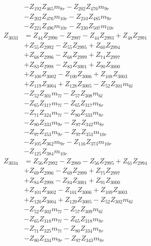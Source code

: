 \begin{multicols}{2}
\begin{align}
&- Z_{192}Z_{465}m_{8r} - Z_{202}Z_{476}m_{9r}  \nonumber \\
&- Z_{202}Z_{476}m_{10r} - Z_{210}Z_{485}m_{9r}  \nonumber \\
&- Z_{221}Z_{496}m_{10r} - Z_{230}Z_{507}m_{10r} \nonumber \\
Z_{3033} &= Z_{44}Z_{2990} - Z_{2987} - Z_{44}Z_{2993} + Z_{48}Z_{2991}  \nonumber \\
&+ Z_{55}Z_{2992} - Z_{55}Z_{2995} + Z_{60}Z_{2994}  \nonumber \\
&+ Z_{68}Z_{2996} - Z_{68}Z_{2999} + Z_{74}Z_{2997}  \nonumber \\
&+ Z_{83}Z_{2998} - Z_{83}Z_{3001} + Z_{90}Z_{3000}  \nonumber \\
&+ Z_{100}Z_{3002} - Z_{100}Z_{3006} + Z_{108}Z_{3003}  \nonumber \\
&+ Z_{119}Z_{3004} + Z_{128}Z_{3005} - Z_{52}Z_{301}m_{6l}  \nonumber \\
&- Z_{52}Z_{301}m_{7l} - Z_{57}Z_{308}m_{6l}  \nonumber \\
&- Z_{65}Z_{317}m_{7l} - Z_{65}Z_{317}m_{8r}  \nonumber \\
&- Z_{71}Z_{324}m_{7l} - Z_{80}Z_{333}m_{8r}  \nonumber \\
&- Z_{80}Z_{333}m_{9r} - Z_{87}Z_{342}m_{8r}  \nonumber \\
&- Z_{97}Z_{353}m_{9r} - Z_{97}Z_{353}m_{10r}  \nonumber \\
&- Z_{105}Z_{362}m_{9r} - Z_{116}Z_{373}m_{10r}  \nonumber \\
&- Z_{125}Z_{384}m_{10r} \nonumber \\
Z_{3034} &= Z_{56}Z_{2992} - Z_{2989} - Z_{56}Z_{2995} + Z_{61}Z_{2994}  \nonumber \\
&+ Z_{69}Z_{2996} - Z_{69}Z_{2999} + Z_{75}Z_{2997}  \nonumber \\
&+ Z_{84}Z_{2998} - Z_{84}Z_{3001} + Z_{91}Z_{3000}  \nonumber \\
&+ Z_{101}Z_{3002} - Z_{101}Z_{3006} + Z_{109}Z_{3003}  \nonumber \\
&+ Z_{120}Z_{3004} + Z_{129}Z_{3005} - Z_{52}Z_{302}m_{6l}  \nonumber \\
&- Z_{52}Z_{302}m_{7l} - Z_{57}Z_{309}m_{6l}  \nonumber \\
&- Z_{65}Z_{318}m_{7l} - Z_{65}Z_{318}m_{8r}  \nonumber \\
&- Z_{71}Z_{325}m_{7l} - Z_{80}Z_{334}m_{8r}  \nonumber \\
&- Z_{80}Z_{334}m_{9r} - Z_{87}Z_{343}m_{8r}  \nonumber \\

\end{align}
\end{multicols}
